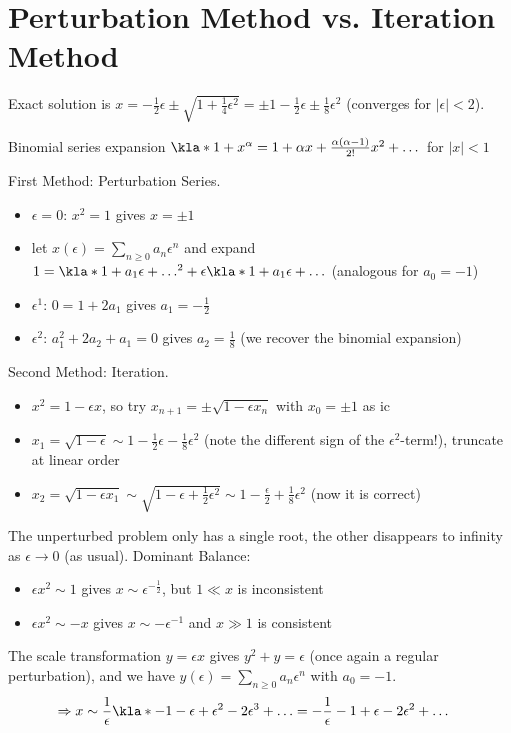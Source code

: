 \documentclass[english, parskip=full]{scrbook}
\newcommand{\note}[1]{\begin{tcolorbox}[colback=colorbackgroundnote,colframe=colornote, breakable,enhanced]#1\end{tcolorbox}}
\newcommand{\example}[3]{\begin{tcolorbox}[colback=colorbackgroundexample,colframe=colorexample, breakable,enhanced,title={\textbf{#1}: #2.}]#3\end{tcolorbox}}
\begin{document}
\section{Perturbation Method vs. Iteration Method}
\example{A regular perturbation}{$x^2+\epsilon x-1=0$}{Exact solution is $x=-\frac{1}{2}\epsilon \pm \sqrt{1 + \frac{1}{4}\epsilon^2} = \pm 1 - \frac{1}{2} \epsilon \pm \frac{1}{8} \epsilon^2$ (converges for $|\epsilon| < 2$).
\note{Binomial series expansion $\kla*{1+x}^\alpha = 1 + \alpha x + \frac{\alpha (\alpha - 1)}{2!} x^2 + \dots$ for $|x|<1$}

First Method: Perturbation Series.
\begin{itemize}
\item $\epsilon=0$: $x^2=1$ gives $x=\pm 1$
\item let $x(\epsilon) = \sum_{n\ge 0} a_n \epsilon^n$ and expand $1 = \kla*{1+a_1\epsilon + \dots}^2 + \epsilon\kla*{1 + a_1\epsilon + \dots}$ (analogous for $a_0=-1$)
\item $\epsilon^1$: $0=1+2a_1$ gives $a_1=-\frac{1}{2}$
\item $\epsilon^2$: $a_1^2 + 2a_2 + a_1=0$ gives $a_2=\frac{1}{8}$ (we recover the binomial expansion)
\end{itemize}
Second Method: Iteration.
\begin{itemize}
\item $x^2=1-\epsilon x$, so try $x_{n+1} = \pm\sqrt{1 - \epsilon x_n}$ with $x_0=\pm 1$ as \gls{ic}
\item $x_1 = \sqrt{1 - \epsilon} \sim 1 - \frac{1}{2} \epsilon - \frac{1}{8}\epsilon^2$ (note the different sign of the $\epsilon^2$-term!), truncate at linear order
\item $x_2=\sqrt{1 - \epsilon x_1} \sim \sqrt{1 - \epsilon + \frac{1}{2}\epsilon^2} \sim 1 - \frac{\epsilon}{2} + \frac{1}{8} \epsilon^2$ (now it is correct)
\end{itemize}
}
\example{A singular perturbation}{$\epsilon x^2 + x - 1 = 0$}{The unperturbed problem only has a single root, the other disappears to infinity as $\epsilon\rightarrow 0$ (as usual).
Dominant Balance:
\begin{itemize}
\item $\epsilon x^2 \sim 1$ gives $x\sim \epsilon^{-\frac{1}{2}}$, but $1 \ll x$ is inconsistent
\item $\epsilon x^2 \sim -x$ gives $x\sim -\epsilon^{-1}$ and $x \gg 1$ is consistent
\end{itemize}
The scale transformation $y = \epsilon x$ gives $y^2 + y = \epsilon$ (once again a regular perturbation), and we have $y(\epsilon) = \sum_{n\ge 0} a_n \epsilon^n$ with $a_0=-1$.
\begin{align*}
\Rightarrow x&\sim \frac{1}{\epsilon} \kla*{-1 - \epsilon + \epsilon^2 - 2\epsilon^3 + \dots} = -\frac{1}{\epsilon} - 1 + \epsilon - 2\epsilon^2 + \dots
\end{align*}
}
\end{document}
